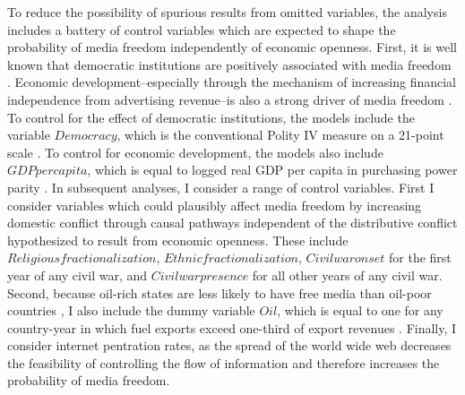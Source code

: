 \documentclass[12pt,a4paper]{article}\usepackage[]{graphicx}\usepackage[]{color}
\begin{document}
To reduce the possibility of spurious results from omitted variables, the analysis includes a battery of control variables which are expected to shape the probability of media freedom independently of economic openness. First, it is well known that democratic institutions are positively associated with media freedom \parencite[13]{Islam:2008wj}. Economic development--especially through the mechanism of increasing financial independence from advertising revenue--is also a strong driver of media freedom \parencites{Petrova:2011ca}{lawson2002building}. To control for the effect of democratic institutions, the models include the variable $Democracy$, which is the conventional Polity IV measure on a 21-point scale \parencite{PolityIVProjectP:2011uq}. To control for economic development, the models also include $GDP per capita$, which is equal to logged real GDP per capita in purchasing power parity \parencite{Heston:HB3Tvq3w}. In subsequent analyses, I consider a range of control variables. First I consider variables which could plausibly affect media freedom by increasing domestic conflict through causal pathways independent of the distributive conflict hypothesized to result from economic openness. These include $Religious fractionalization$, $Ethnic fractionalization$, $Civil war onset$ for the first year of any civil war, and $Civil war presence$ for all other years of any civil war. Second, because oil-rich states are less likely to have free media than oil-poor countries \parencite{Egorov:2009hc}, I also include the dummy variable $Oil$, which is equal to one for any country-year in which fuel exports exceed one-third of export revenues \parencite{Fearon:2003ht}. Finally, I consider internet pentration rates, as the spread of the world wide web decreases the feasibility of controlling the flow of information and therefore increases the probability of media freedom.
\end{document}
